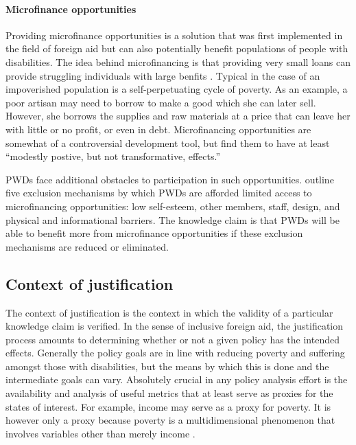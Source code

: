 \documentclass[a4paper]{article}
\begin{document}
\paragraph{Microfinance opportunities}

Providing microfinance opportunities is a solution that was first implemented
in the field of foreign aid but can also potentially benefit populations of
people with disabilities. The idea behind microfinancing is that providing
very small loans can provide struggling individuals with large benfits
\citep{wendt2006building}. Typical in the case of an impoverished population
is a self-perpetuating cycle of poverty. As an example, a poor artisan may
need to borrow to make a good which she can later sell. However, she borrows
the supplies and raw materials at a price that can leave her with little or no
profit, or even in debt. Microfinancing opportunities are somewhat of a
controversial development tool, but \cite{banerjee2015six} find them to have
at least ``modestly postive, but not transformative, effects.''

PWDs face additional obstacles to participation in such opportunities.
\cite{mersland2008access} outline five exclusion mechanisms by which PWDs are
afforded limited access to microfinancing opportunities: low self-esteem,
other members, staff, design, and physical and informational barriers. The
knowledge claim is that PWDs will be able to benefit more from microfinance
opportunities if these exclusion mechanisms are reduced or eliminated.

\subsection{Context of justification}

The context of justification is the context in which the validity of a
particular knowledge claim is verified. In the sense of inclusive foreign aid,
the justification process amounts to determining whether or not a given policy
has the intended effects. Generally the policy goals are in line with reducing
poverty and suffering amongst those with disabilities, but the means by which
this is done and the intermediate goals can vary. Absolutely crucial in any
policy analysis effort is the availability and analysis of useful metrics that
at least serve as proxies for the states of interest. For example, income may
serve as a proxy for poverty. It is however only a proxy because poverty is a
multidimensional phenomenon that involves variables other than merely income
\citep{alkire2011understandings}.
\end{document}
